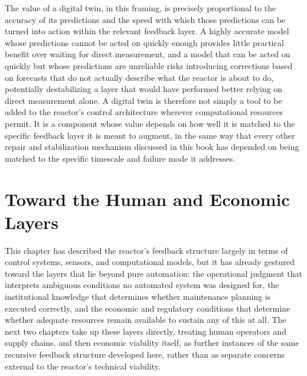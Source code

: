 The value of a digital twin, in this framing, is precisely proportional to the accuracy of its predictions and the speed with which those predictions can be turned into action within the relevant feedback layer. A highly accurate model whose predictions cannot be acted on quickly enough provides little practical benefit over waiting for direct measurement, and a model that can be acted on quickly but whose predictions are unreliable risks introducing corrections based on forecasts that do not actually describe what the reactor is about to do, potentially destabilizing a layer that would have performed better relying on direct measurement alone. A digital twin is therefore not simply a tool to be added to the reactor's control architecture wherever computational resources permit. It is a component whose value depends on how well it is matched to the specific feedback layer it is meant to augment, in the same way that every other repair and stabilization mechanism discussed in this book has depended on being matched to the specific timescale and failure mode it addresses.

\section{Toward the Human and Economic Layers}

This chapter has described the reactor's feedback structure largely in terms of control systems, sensors, and computational models, but it has already gestured toward the layers that lie beyond pure automation: the operational judgment that interprets ambiguous conditions no automated system was designed for, the institutional knowledge that determines whether maintenance planning is executed correctly, and the economic and regulatory conditions that determine whether adequate resources remain available to sustain any of this at all. The next two chapters take up these layers directly, treating human operators and supply chains, and then economic viability itself, as further instances of the same recursive feedback structure developed here, rather than as separate concerns external to the reactor's technical viability.

